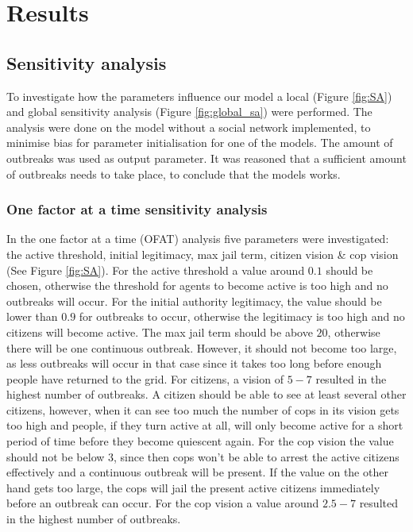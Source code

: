 \documentclass[10pt]{article}
\begin{document}
    \section{Results}

    \subsection{Sensitivity analysis}
    To investigate how the parameters influence our model a local (Figure \ref{fig:SA}) and global sensitivity analysis (Figure \ref{fig:global_sa}) were performed. The analysis were done on the model without a social network implemented, to minimise bias for parameter initialisation for one of the models. The amount of outbreaks was used as output parameter. It was reasoned that a sufficient amount of outbreaks needs to take place, to conclude that the models works.

    \subsubsection{One factor at a time sensitivity analysis}
    In the one factor at a time (OFAT) analysis five parameters were investigated: the active threshold, initial legitimacy, max jail term, citizen vision \& cop vision (See Figure \ref{fig:SA}). For the active threshold a value around $0.1$ should be chosen, otherwise the threshold for agents to become active is too high and no outbreaks will occur. For the initial authority legitimacy, the value should be lower than $0.9$ for outbreaks to occur, otherwise the legitimacy is too high and no citizens will become active. The max jail term should be above $20$, otherwise there will be one continuous outbreak. However, it should not become too large, as less outbreaks will occur in that case since it takes too long before enough people have returned to the grid. For citizens, a vision of $5-7$ resulted in the highest number of outbreaks. A citizen should be able to see at least several other citizens, however, when it can see too much the number of cops in its vision gets too high and people, if they turn active at all, will only become active for a short period of time before they become quiescent again. For the cop vision the value should not be below $3$, since then cops won't be able to arrest the active citizens effectively and a continuous outbreak will be present. If the value on the other hand gets too large, the cops will jail the present active citizens immediately before an outbreak can occur. For the cop vision a value around $2.5-7$ resulted in the highest number of outbreaks.
\end{document}
